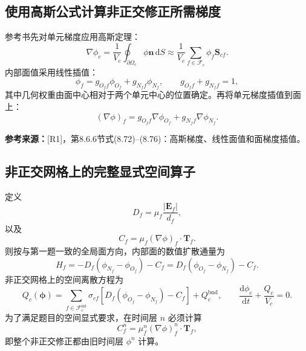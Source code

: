 \documentclass[UTF8,12pt,a4paper]{ctexart}
\numberwithin{equation}{section}
\newcommand{\Rone}{\textnormal{[R1]}}
\newcommand{\source}[1]{%
  \par\smallskip
  \noindent\colorbox{sourcebg}{%
    \parbox{0.955\linewidth}{\raggedright\footnotesize\color{sourcegray}\textbf{参考来源：}#1}%
  }
  \par\smallskip
}
\newcommand{\dd}{\,\mathrm d}
\newcommand{\Sf}{\bm S}
\newcommand{\Ef}{\bm E}
\newcommand{\Tf}{\bm T}
\begin{document}
\subsection{使用高斯公式计算非正交修正所需梯度}

参考书先对单元梯度应用高斯定理：
\begin{equation}
  \nabla\phi_c
  =\frac{1}{V_c}
   \oint_{\partial\Omega_c}\phi\bm n\dd S
  \approx
  \boxed{
  \frac{1}{V_c}
  \sum_{f\in\mathcal F_c}\phi_f\Sf_{cf}}.
  \label{eq:gauss_cell_gradient}
\end{equation}
内部面值采用线性插值：
\begin{equation}
  \phi_f=g_{O_f f}\phi_{O_f}+g_{N_f f}\phi_{N_f},
  \qquad g_{O_f f}+g_{N_f f}=1,
  \label{eq:linear_face_value}
\end{equation}
其中几何权重由面中心相对于两个单元中心的位置确定。再将单元梯度插值到面上：
\begin{equation}
  \boxed{
  (\nabla\phi)_f
  =g_{O_f f}\nabla\phi_{O_f}
  +g_{N_f f}\nabla\phi_{N_f}}.
  \label{eq:face_gradient_interpolation}
\end{equation}

\source{\Rone，第8.6.6节式(8.72)--(8.76)：高斯梯度、线性面值和面梯度插值。}

\subsection{非正交网格上的完整显式空间算子}

定义
\begin{equation}
  D_f=\mu_f\frac{|\Ef_f|}{d_f},
  \label{eq:D_nonorth}
\end{equation}
以及
\begin{equation}
  C_f=\mu_f(\nabla\phi)_f\cdot\Tf_f.
  \label{eq:cross_diffusion}
\end{equation}
则按与第一题一致的全局面方向，内部面的数值扩散通量为
\begin{equation}
  \boxed{
  H_f
  =-D_f(\phi_{N_f}-\phi_{O_f})-C_f
  =D_f(\phi_{O_f}-\phi_{N_f})-C_f}.
  \label{eq:full_nonorth_flux}
\end{equation}
非正交网格上的空间离散方程为
\begin{equation}
  \boxed{
  Q_c(\bm\phi)
  =\sum_{f\in\mathcal F_c^{\mathrm{int}}}\sigma_{cf}
  \left[D_f(\phi_{O_f}-\phi_{N_f})-C_f\right]+Q_c^{\mathrm{bnd}},
  \qquad
  \frac{\mathrm d\phi_c}{\mathrm dt}+\frac{Q_c}{V_c}=0}.
  \label{eq:nonorth_semidiscrete}
\end{equation}
为了满足题目的空间显式要求，在时间层 $n$ 必须计算
\begin{equation}
  C_f^n=\mu_f^n(\nabla\phi)_f^n\cdot\Tf_f,
  \label{eq:explicit_correction}
\end{equation}
即整个非正交修正都由旧时间层 $\phi^n$ 计算。
\end{document}
